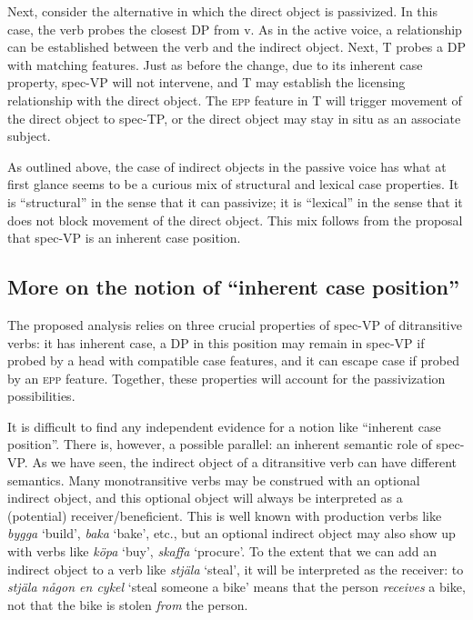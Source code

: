 \documentclass[output=paper]{langscibook}
\begin{document}
Next, consider the alternative in which the direct object is passivized. In this case, the verb probes the closest DP from v. As in the active voice, a relationship can be established between the verb and the indirect object. Next, T probes a DP with matching features. Just as before the change, due to its inherent case property, spec-VP will not intervene, and T may establish the licensing relationship with the direct object. The \textsc{epp} feature in T will trigger movement of the direct object to spec-TP, or the direct object may stay in situ as an associate subject.



As outlined above, the case of indirect objects in the passive voice has what at first glance seems to be a curious mix of structural and lexical case properties. It is “structural” in the sense that it can passivize; it is “lexical” in the sense that it does not block movement of the direct object. This mix follows from the proposal that spec-VP is an inherent case position.


\subsection{More on the notion of “inherent case position”}\label{sec:falk:4.4}


The proposed analysis relies on three crucial properties of spec-VP of ditransitive verbs: it has inherent case, a DP in this position may remain in spec-VP if probed by a head with compatible case features, and it can escape case if probed by an \textsc{epp} feature. Together, these properties will account for the passivization possibilities.


It is difficult to find any independent evidence for a notion like “inherent case position”. There is, however, a possible parallel: an inherent semantic role of spec-VP. As we have seen, the indirect object of a ditransitive verb can have different semantics. Many monotransitive verbs may be construed with an optional indirect object, and this optional object will always be interpreted as a (potential) receiver/beneficient. This is well known with production verbs like \textit{bygga} ‘build’, \textit{baka} ‘bake’, etc., but an optional indirect object may also show up with verbs like \textit{köpa} ‘buy’, \textit{skaffa} ‘procure’. To the extent that we can add an indirect object to a verb like \textit{stjäla} ‘steal’, it will be interpreted as the receiver: to \textit{stjäla någon en cykel} ‘steal someone a bike’ means that the person \textit{receives} a bike, not that the bike is stolen \textit{from} the person. 
\end{document}
